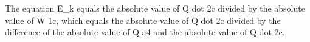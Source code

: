 The equation E_k equals the absolute value of Q dot 2c divided by the absolute value of W 1c, which equals the absolute value of Q dot 2c divided by the difference of the absolute value of Q a4 and the absolute value of Q dot 2c.